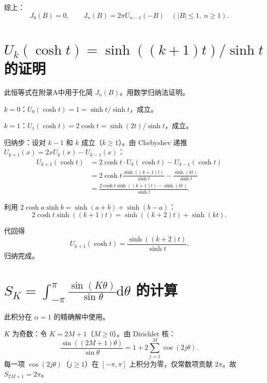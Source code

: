 \documentclass{article} %
\newcommand{\di}{\mathrm{d}}
\begin{document}
综上：
\begin{equation}
    \boxed{
    J_0(B) = 0,\qquad J_n(B) = 2\pi U_{n-1}(-B)\quad (|B|\le 1,\ n\ge 1).
    }
    \label{eq:A5}
\end{equation}

\section{$U_k(\cosh t) = \sinh((k+1)t)/\sinh t$ 的证明}

此恒等式在附录A中用于化简 $J_n(B)$。用数学归纳法证明。

$k=0$：$U_0(\cosh t) = 1 = \sinh t/\sinh t$，成立。

$k=1$：$U_1(\cosh t) = 2\cosh t = \sinh(2t)/\sinh t$，成立。

归纳步：设对 $k-1$ 和 $k$ 成立（$k\ge 1$）。由 Chebyshev 递推 $U_{k+1}(x) = 2xU_k(x) - U_{k-1}(x)$：
\begin{align}
    U_{k+1}(\cosh t) &= 2\cosh t\cdot U_k(\cosh t) - U_{k-1}(\cosh t) \nonumber\\
    &= 2\cosh t\frac{\sinh((k+1)t)}{\sinh t} - \frac{\sinh(kt)}{\sinh t} \nonumber\\
    &= \frac{2\cosh t\sinh((k+1)t) - \sinh(kt)}{\sinh t}.
\end{align}

利用 $2\cosh a\sinh b = \sinh(a+b) + \sinh(b-a)$：
\begin{equation}
    2\cosh t\sinh((k+1)t) = \sinh((k+2)t) + \sinh(kt).
\end{equation}

代回得
\begin{equation}
    U_{k+1}(\cosh t) = \frac{\sinh((k+2)t)}{\sinh t}.
\end{equation}
归纳完成。

\section{$S_K = \int_{-\pi}^{\pi} \frac{\sin(K\theta)}{\sin\theta} \di\theta$ 的计算}

此积分在 $\alpha=1$ 的精确解中使用。

$K$ 为奇数：令 $K=2M+1$（$M\ge 0$）。由 Dirichlet 核：
\begin{equation}
    \frac{\sin((2M+1)\theta)}{\sin\theta} = 1 + 2\sum_{j=1}^{M}\cos(2j\theta).
\end{equation}
每一项 $\cos(2j\theta)$（$j\ge 1$）在 $[-\pi,\pi]$ 上积分为零，仅常数项贡献 $2\pi$。故 $S_{2M+1} = 2\pi$。
\end{document}
